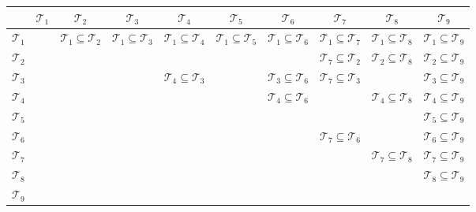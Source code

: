 \documentclass{article}
\newcommand{\xmark}{\ding{55}}
\begin{document}
\begin{table}[h]
	\begin{tabularx}{\textwidth}{|X|X|c|c|c|c|c|c|c|c|}
		\hline
		  &$\mathcal{T}_{1}$   &$\mathcal{T}_{2}$ & $\mathcal{T}_{3}$ & $\mathcal{T}_{4}$ &  $\mathcal{T}_{5}$ &  $\mathcal{T}_{6}$ &$\mathcal{T}_{7}$ &  $\mathcal{T}_{8}$ & $\mathcal{T}_{9}$ \\ \hline
		 $\mathcal{T}_{1}$ &\cellcolor{green!25}  & $\mathcal{T}_{1} \subseteq \mathcal{T}_{2}$ & $\mathcal{T}_{1} \subseteq \mathcal{T}_{3}$ & $\mathcal{T}_{1} \subseteq \mathcal{T}_{4}$ & $\mathcal{T}_{1} \subseteq \mathcal{T}_{5}$ & $\mathcal{T}_{1} \subseteq \mathcal{T}_{6}$ &  $\mathcal{T}_{1} \subseteq \mathcal{T}_{7}$ & $\mathcal{T}_{1} \subseteq \mathcal{T}_{8}$ & $\mathcal{T}_{1} \subseteq \mathcal{T}_{9}$  \\ \hline
		 
		 $\mathcal{T}_{2}$ &  & \cellcolor{green!25} & \textcolor{red}{\xmark} & \textcolor{red}{\xmark} & \textcolor{red}{\xmark} & \textcolor{red}{\xmark} & $\mathcal{T}_{7} \subseteq \mathcal{T}_{2}$  & 
		 $\mathcal{T}_{2} \subseteq \mathcal{T}_{8}$ & $\mathcal{T}_{2} \subseteq \mathcal{T}_{9}$  \\ \hline
		 
		 $\mathcal{T}_{3}$ &  &  & \cellcolor{green!25} & $\mathcal{T}_{4} \subseteq \mathcal{T}_{3}$ & \textcolor{red}{\xmark} & $\mathcal{T}_{3} \subseteq \mathcal{T}_{6}$ &  $\mathcal{T}_{7} \subseteq \mathcal{T}_{3}$& \textcolor{red}{\xmark} & $\mathcal{T}_{3} \subseteq \mathcal{T}_{9}$ \\ \hline
		 
		 $\mathcal{T}_{4}$ &  &  &  & \cellcolor{green!25} & \textcolor{red}{\xmark} & $\mathcal{T}_{4} \subseteq \mathcal{T}_{6}$ &  \textcolor{red}{\xmark} & $\mathcal{T}_{4} \subseteq \mathcal{T}_{8}$  & $\mathcal{T}_{4} \subseteq \mathcal{T}_{9}$ \\ \hline
	    
	    $\mathcal{T}_{5}$ &  &  &  &  & \cellcolor{green!25} & \textcolor{red}{\xmark} &  \textcolor{red}{\xmark} & \textcolor{red}{\xmark}  & $\mathcal{T}_{5} \subseteq \mathcal{T}_{9}$ \\ \hline
	
	 $\mathcal{T}_{6}$ &  &  &  &  &  & \cellcolor{green!25} &  $\mathcal{T}_{7} \subseteq \mathcal{T}_{6}$ & \textcolor{red}{\xmark} & $\mathcal{T}_{6} \subseteq \mathcal{T}_{9}$  \\ \hline
		
		 $\mathcal{T}_{7}$ &  &  &  &  &  &  &  \cellcolor{green!25} & $\mathcal{T}_{7} \subseteq \mathcal{T}_{8}$ & $\mathcal{T}_{7} \subseteq \mathcal{T}_{9}$ \\ \hline
		
		 $\mathcal{T}_{8}$ &  &  &  &  &  &  &   & \cellcolor{green!25} & $\mathcal{T}_{8} \subseteq \mathcal{T}_{9}$  \\ \hline
		
		$\mathcal{T}_{9}$ &  &  &  &  &  &  &   &   & \cellcolor{green!25} \\ \hline
	\end{tabularx}
\end{table}
\end{document}
